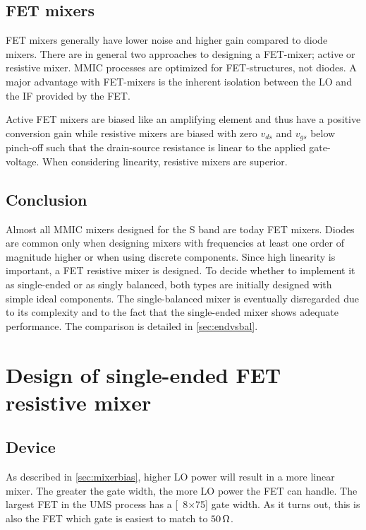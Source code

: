 		\subsection{FET mixers}\label{sec:fet_mixers}
			FET mixers generally have lower noise and higher gain compared to diode mixers. There are in general two approaches to designing a FET-mixer; active or resistive mixer. MMIC processes are optimized for FET-structures, not diodes. A major advantage with FET-mixers is the inherent isolation between the LO and the IF provided by the FET.

			Active FET mixers are biased like an amplifying element and thus have a positive conversion gain while resistive mixers are biased with zero $v_{ds}$ and $v_{gs}$ below pinch-off such that the drain-source resistance is linear to the applied gate-voltage. When considering linearity, resistive mixers are superior.\autocites{maas92,maas98}

		\subsection{Conclusion}
			Almost all MMIC mixers designed for the S band are today FET mixers. Diodes are common only when designing mixers with frequencies at least one order of magnitude higher or when using discrete components. Since high linearity is important, a FET resistive mixer is designed. To decide whether to implement it as single-ended or as singly balanced, both types are initially designed with simple ideal components. The single-balanced mixer is eventually disregarded due to its complexity and to the fact that the single-ended mixer shows adequate performance. The comparison is detailed in \autoref{sec:endvsbal}.

	\section{Design of single-ended FET resistive mixer}
		\subsection{Device}\label{sec:mixerdevice}
			As described in \autoref{sec:mixerbias}, higher LO power will result in a more linear mixer. The greater the gate width, the more LO power the FET can handle. The largest FET in the UMS process has a \unit[8$\times$75]{\mum} gate width. As it turns out, this is also the FET which gate is easiest to match to $\unit[50]{\Omega}$.\autocite{gustavsson07}

